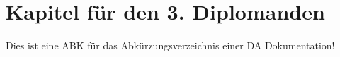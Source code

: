 \documentclass[a4paper, 12pt, xcolor=dvipsnames]{scrartcl}		%
\begin{document}
\section{Kapitel für den 3. Diplomanden}
Dies ist eine \acs{ABK} für das Abkürzungsverzeichnis einer \acs{DA} Dokumentation!

%
% 
%
%
%
\end{document}
